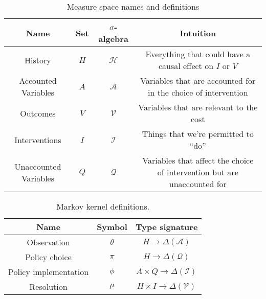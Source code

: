 \begin{table}[h]
    \centering
    \begin{tabular}{c|c|c|c}
        Name & Set & $\sigma$-algebra & Intuition \\
        \hline
        History & $H$ & $\mathcal{H}$ & Everything that could have a causal effect on $I$ or $V$ \\
        Accounted Variables & $A$ & $\mathcal{A}$ & Variables that are accounted for in the choice of intervention\\
        Outcomes & $V$ & $\mathcal{V}$ & Variables that are relevant to the cost \\
        Interventions & $I$ & $\mathcal{I}$ & Things that we're permitted to ``do''  \\
        Unaccounted Variables & $Q$ & $\mathcal{Q}$ & Variables that affect the choice of intervention but are unaccounted for
    \end{tabular}
    \caption{Measure space names and definitions}
    \label{tab:measure_spaces}
\end{table}

\begin{table}[h]
    \centering
    \begin{tabular}{c|c|c}
        Name & Symbol & Type signature  \\
        \hline
        Observation & $\theta$ & $H\to \Delta(\mathcal{A})$ \\
        Policy choice & $\pi$ & $H\to \Delta(\mathcal{Q })$ \\
        Policy implementation & $\phi$ & $A\times Q\to \Delta(\mathcal{I})$ \\
        Resolution & $\mu$ & $H\times I \to \Delta(\mathcal{V})$  \\
    \end{tabular}
    \caption{Markov kernel definitions.}
    \label{tab:kernels}
\end{table}

